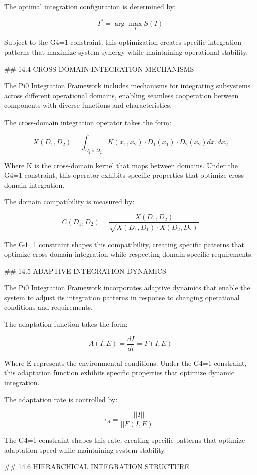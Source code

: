 The optimal integration configuration is determined by:

$$I^* = \arg\max_I S(I)$$

Subject to the G4=1 constraint, this optimization creates specific integration patterns that maximize system synergy while maintaining operational stability.

## 14.4 CROSS-DOMAIN INTEGRATION MECHANISMS

The Pi0 Integration Framework includes mechanisms for integrating subsystems across different operational domains, enabling seamless cooperation between components with diverse functions and characteristics.

The cross-domain integration operator takes the form:

$$X(D_1, D_2) = \int_{\Omega_1 \times \Omega_2} K(x_1, x_2) \cdot D_1(x_1) \cdot D_2(x_2) dx_1 dx_2$$

Where K is the cross-domain kernel that maps between domains. Under the G4=1 constraint, this operator exhibits specific properties that optimize cross-domain integration.

The domain compatibility is measured by:

$$C(D_1, D_2) = \frac{X(D_1, D_2)}{\sqrt{X(D_1, D_1) \cdot X(D_2, D_2)}}$$

The G4=1 constraint shapes this compatibility, creating specific patterns that optimize cross-domain integration while respecting domain-specific requirements.

## 14.5 ADAPTIVE INTEGRATION DYNAMICS

The Pi0 Integration Framework incorporates adaptive dynamics that enable the system to adjust its integration patterns in response to changing operational conditions and requirements.

The adaptation function takes the form:

$$A(I, E) = \frac{dI}{dt} = F(I, E)$$

Where E represents the environmental conditions. Under the G4=1 constraint, this adaptation function exhibits specific properties that optimize dynamic integration.

The adaptation rate is controlled by:

$$\tau_A = \frac{||I||}{||F(I, E)||}$$

The G4=1 constraint shapes this rate, creating specific patterns that optimize adaptation speed while maintaining system stability.

## 14.6 HIERARCHICAL INTEGRATION STRUCTURE

